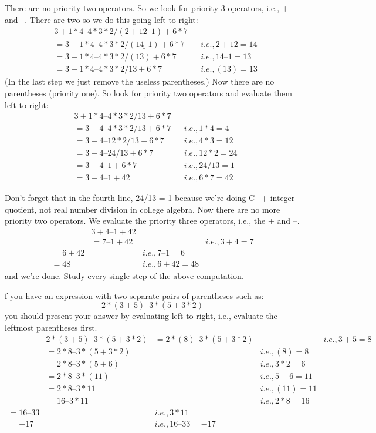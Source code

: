 There are no priority two operators. So we look for priority 3 operators,
i.e., + and –. There are two so we do this going left-to-right:
\begin{align*}
&3 + 1 * 4 – 4 * 3 * 2 / (\underline{2 + 12} – 1) + 6 * 7\\
&= 3 + 1 * 4 – 4 * 3 * 2 / (\underline{14 – 1}) + 6 * 7 & &i.e., 2 + 12 = 14\\
&= 3 + 1 * 4 – 4 * 3 * 2 / (13) + 6 * 7 & &i.e., 14 – 1 = 13\\
&= 3 + 1 * 4 – 4 * 3 * 2 / 13 + 6 * 7 & &i.e., (13) = 13
\end{align*}
(In the last step we just remove the useless parentheses.) Now there are
no parentheses (priority one). So look for priority two operators and
evaluate them left-to-right:
\begin{align*}
&3 + 1 * 4 – 4 * 3 * 2 / 13 + 6 * 7\\
&= 3 + 4 – 4 * 3 * 2 / 13 + 6 * 7 & &i.e., 1 * 4 = 4\\
&= 3 + 4 – 12 * 2 / 13 + 6 * 7 & &i.e., 4 * 3 = 12\\
&= 3 + 4 – 24 / 13 + 6 * 7 & &i.e., 12 * 2 = 24\\
&=3+4–1+6*7 & &i.e., 24 / 13 = 1\\
&= 3 + 4 – 1 + 42 & &i.e., 6 * 7 = 42
\end{align*}

Don't forget that in the fourth line, 24/13 = 1 because we're doing C++
integer quotient, not real number division in college algebra.
Now there are no more priority two operators. We evaluate the priority
three operators, i.e., the + and –.
\begin{align*}
&3 + 4 – 1 + 42\\
&= 7 – 1 + 42 & &i.e., 3 + 4 = 7\\
= 6 + 42 & &i.e., 7 – 1 = 6\\
= 48 & &i.e., 6 + 42 = 48
\end{align*}
and we're done.
Study every single step of the above computation.

%
%
%
%

f you have an expression with \underline{two} separate pairs of parentheses such
as:
\[2 * (3 + 5) – 3 * (5 + 3 * 2)\]
you should present your answer by evaluating left-to-right, i.e., evaluate
the leftmost parentheses first.
\begin{align*}
&2 * (3 + 5) – 3 * (5 + 3 * 2)
&= 2 * (8) – 3 * (5 + 3 * 2) & &i.e., 3 + 5 = 8\\
&= 2 * 8 – 3 * (5 + 3 * 2) & &i.e., (8) = 8\\
&= 2 * 8 – 3 * (5 + 6) & &i.e., 3 * 2 = 6\\
&= 2 * 8 – 3 * (11) & &i.e., 5 + 6 = 11 \\
&= 2 * 8 – 3 * 11 & &i.e., (11) = 11 \\
&= 16 – 3 * 11 & &i.e., 2 * 8 = 16\\
= 16 – 33 & &i.e., 3 * 11\\
= -17 & &i.e., 16 – 33 = -17
\end{align*}

